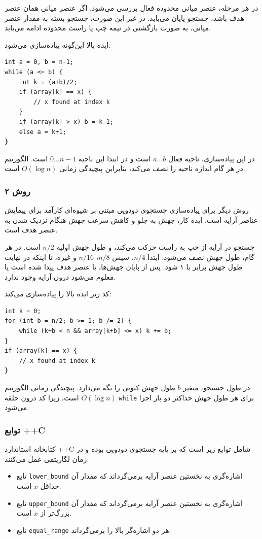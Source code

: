 در هر مرحله، عنصر میانی محدوده فعال بررسی می‌شود.
اگر عنصر میانی همان عنصر هدف باشد،
جستجو پایان می‌یابد.
در غیر این صورت، جستجو بسته به مقدار عنصر میانی،
به صورت بازگشتی در نیمه چپ یا راست محدوده ادامه می‌یابد.

ایده بالا این‌گونه پیاده‌سازی می‌شود:
\begin{lstlisting}
int a = 0, b = n-1;
while (a <= b) {
    int k = (a+b)/2;
    if (array[k] == x) {
        // x found at index k
    }
    if (array[k] > x) b = k-1;
    else a = k+1;
}
\end{lstlisting}

در این پیاده‌سازی، ناحیه فعال $a \ldots b$ است
و در ابتدا این ناحیه $0 \ldots n-1$ است.
الگوریتم در هر گام اندازه ناحیه را نصف می‌کند،
بنابراین پیچیدگی زمانی $O(\log n)$ است.

\subsubsection{روش ۲}

روش دیگر برای پیاده‌سازی جستجوی دودویی
مبتنی بر شیوه‌ای کارآمد برای پیمایش عناصر آرایه است.
ایده کار، جهش به جلو و کاهش سرعت جهش هنگام نزدیک شدن به عنصر هدف است.

جستجو در آرایه از چپ به راست حرکت می‌کند،
و طول جهش اولیه $n/2$ است.
در هر گام، طول جهش نصف می‌شود:
ابتدا $n/4$، سپس $n/8$، $n/16$ و غیره، تا اینکه در نهایت طول جهش برابر با ۱ شود.
پس از پایان جهش‌ها، یا عنصر هدف پیدا شده است
یا معلوم می‌شود درون آرایه وجود ندارد.

کد زیر ایده بالا را پیاده‌سازی می‌کند:
\begin{lstlisting}
int k = 0;
for (int b = n/2; b >= 1; b /= 2) {
    while (k+b < n && array[k+b] <= x) k += b;
}
if (array[k] == x) {
    // x found at index k
}
\end{lstlisting}

در طول جستجو، متغیر $b$ طول جهش کنونی را نگه می‌دارد.
پیچیدگی زمانی الگوریتم $O(\log n)$ است،
زیرا کد درون حلقه \texttt{while} برای هر طول جهش حداکثر دو بار اجرا می‌شود.

\subsubsection{توابع ++C}

کتابخانه استاندارد ++C شامل توابع زیر است
که بر پایه جستجوی دودویی بوده و در زمان لگاریتمی عمل می‌کنند:

\begin{itemize}
\item تابع \texttt{lower\_bound} اشاره‌گری به نخستین عنصر آرایه برمی‌گرداند که مقدار آن حداقل $x$ است.
\item تابع \texttt{upper\_bound} اشاره‌گری به نخستین عنصر آرایه برمی‌گرداند که مقدار آن بزرگ‌تر از $x$ است.
\item تابع \texttt{equal\_range} هر دو اشاره‌گر بالا را برمی‌گرداند.
\end{itemize}

